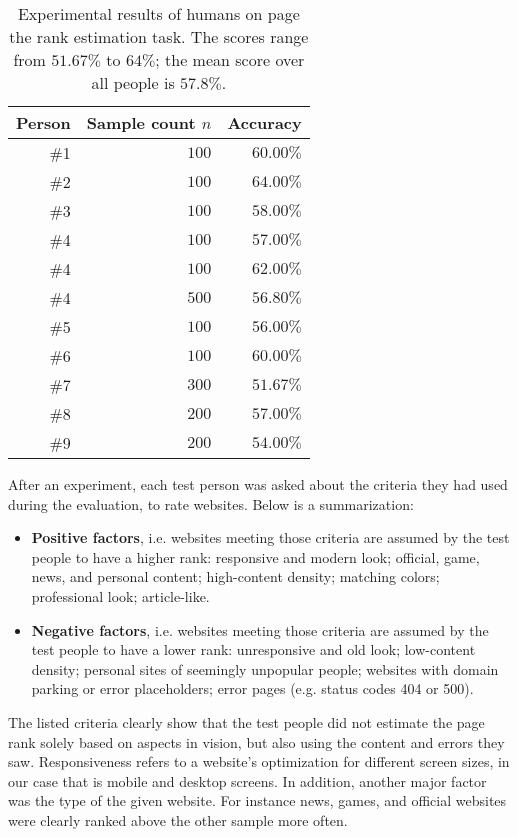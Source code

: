 \begin{table}
	\center
	\begin{tabular}{rrr}
		\textbf{Person} & \textbf{Sample count $n$} & \textbf{Accuracy} \\ \hline
		\#1 & $100$ & $60.00\%$\\
		\#2 & $100$ & $64.00\%$\\
		\#3 & $100$ & $58.00\%$\\
        \#4 & $100$ & $57.00\%$\\
        \#4 & $100$ & $62.00\%$\\
        \#4 & $500$ & $56.80\%$\\
		\#5 & $100$ & $56.00\%$\\
		\#6 & $100$ & $60.00\%$\\
		\#7 & $300$ & $51.67\%$\\
		\#8 & $200$ & $57.00\%$\\
		\#9 & $200$ & $54.00\%$\\
	\end{tabular}
	\caption[Experimental results of humans on the page rank estimation task]{Experimental results of humans on page the rank estimation task. The scores range from $51.67\%$ to $64\%$; the mean score over all people is $57.8\%$.}
\label{table_human_eval_results}
\end{table}

After an experiment, each test person was asked about the criteria they had used during the evaluation, to rate websites. Below is a summarization:

\begin{itemize}
	\item \textbf{Positive factors}, i.e. websites meeting those criteria are assumed by the test people to have a higher rank: responsive and modern look; official, game, news, and personal content; high-content density; matching colors; professional look; article-like.
	\item \textbf{Negative factors}, i.e. websites meeting those criteria are assumed by the test people to have a lower rank: unresponsive and old look; low-content density; personal sites of seemingly unpopular people; websites with domain parking or error placeholders; error pages (e.g. status codes 404 or 500).
\end{itemize}

The listed criteria clearly show that the test people did not estimate the page rank solely based on aspects in vision, but also using the content and errors they saw. Responsiveness refers to a website's optimization for different screen sizes, in our case that is mobile and desktop screens. In addition, another major factor was the type of the given website. For instance news, games, and official websites were clearly ranked above the other sample more often.

